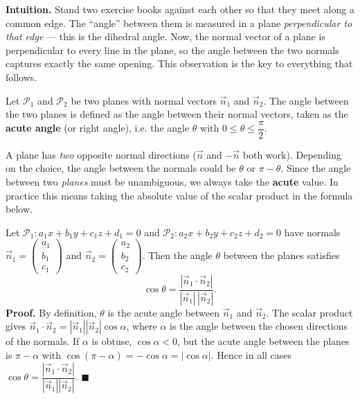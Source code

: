 \documentclass[11pt]{article}
\newcommand{\cle}[1]{{\popxbold\color{popdark}#1}}
\begin{document}
\textbf{Intuition.} Stand two exercise books against each other so that they meet along a common edge. The ``angle'' between them is measured in a plane \emph{perpendicular to that edge} — this is the \cle{dihedral angle}. Now, the normal vector of a plane is perpendicular to every line in the plane, so the angle between the two normals captures exactly the same opening. This observation is the key to everything that follows.

\begin{definition}
Let $\mathcal{P}_1$ and $\mathcal{P}_2$ be two planes with normal vectors $\vec{n}_1$ and $\vec{n}_2$. The \cle{angle between the two planes} is defined as the angle between their normal vectors, taken as the \textbf{acute angle} (or right angle), i.e. the angle $\theta$ with $0 \leq \theta \leq \dfrac{\pi}{2}$.
\end{definition}

\begin{attention}
A plane has \emph{two} opposite normal directions ($\vec{n}$ and $-\vec{n}$ both work). Depending on the choice, the angle between the normals could be $\theta$ or $\pi - \theta$. Since the angle between two \emph{planes} must be unambiguous, we always take the \textbf{acute} value. In practice this means taking the absolute value of the scalar product in the formula below.
\end{attention}

\begin{propriete}
Let $\mathcal{P}_1: a_1x+b_1y+c_1z+d_1=0$ and $\mathcal{P}_2: a_2x+b_2y+c_2z+d_2=0$ have normals $\vec{n}_1=\begin{pmatrix}a_1\\b_1\\c_1\end{pmatrix}$ and $\vec{n}_2=\begin{pmatrix}a_2\\b_2\\c_2\end{pmatrix}$. Then the angle $\theta$ between the planes satisfies
\[
\cos\theta=\frac{|\vec{n}_1\cdot\vec{n}_2|}{|\vec{n}_1|\,|\vec{n}_2|}.
\]
\textbf{Proof.} By definition, $\theta$ is the acute angle between $\vec{n}_1$ and $\vec{n}_2$. The scalar product gives $\vec{n}_1\cdot\vec{n}_2=|\vec{n}_1||\vec{n}_2|\cos\alpha$, where $\alpha$ is the angle between the chosen directions of the normals. If $\alpha$ is obtuse, $\cos\alpha<0$, but the acute angle between the planes is $\pi-\alpha$ with $\cos(\pi-\alpha)=-\cos\alpha=|\cos\alpha|$. Hence in all cases $\cos\theta=\dfrac{|\vec{n}_1\cdot\vec{n}_2|}{|\vec{n}_1||\vec{n}_2|}$. $\blacksquare$
\end{propriete}
\end{document}
